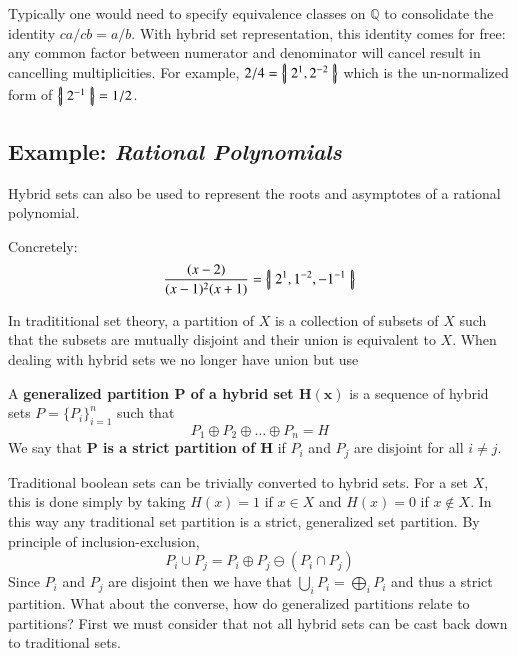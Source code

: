 Typically one would need to specify equivalence classes on $\mathbb{Q}$ to consolidate the identity $ca/cb = a/b$.
With hybrid set representation, this identity comes for free:
any common factor between numerator and denominator will cancel result in cancelling multiplicities. 
For example, $2/4 = \left\{ \! \left| \; 2^1, 2^{-2} \; \right| \! \right\}$ which is the un-normalized form of $\left\{ \! \left| \; 2^{-1} \; \right| \! \right\} = 1/2$.





\subsection{Example: \emph{Rational Polynomials}}

Hybrid sets can also be used to represent the roots and asymptotes of a rational polynomial.


\begin{example} Concretely: 
	\begin{equation}
		\frac{(x-2)}{(x-1)^2(x+1)} = \left\{ \! \left| \;  2^1, 1^{-2}, -1^{-1}  \; \right| \! \right\}
	\end{equation}
\end{example}

\newpage

In tradititional set theory, a partition of $X$ is a collection of subsets of $X$ such that 
the subsets are mutually disjoint and their union is equivalent to $X$.
When dealing with hybrid sets we no longer have union but use 

\begin{definition}
	A \textbf{generalized partition $\boldsymbol{P}$ of a hybrid set $\boldsymbol{H(x)}$} is a sequence of hybrid sets
	$P=\{P_i \}_{i=1}^n$ such that
	\begin{equation}
		P_1 \oplus P_2 \oplus \ldots \oplus P_n = H
	\end{equation}
	We say that \textbf{$\boldsymbol{P}$ is a strict partition of $\boldsymbol{H}$} if 
	$P_i$ and $P_j$ are disjoint for all $i \neq j$.
\end{definition}


Traditional boolean sets can be trivially converted to hybrid sets.
For a set $X$, this is done simply by taking $H(x)=1$ if $x \in X$ and $H(x)=0$ if $x \notin X$.
In this way any traditional set partition is a strict, generalized set partition.
By principle of inclusion-exclusion, 
\begin{equation*}
	P_i \cup P_j = P_i \oplus P_j \ominus (P_i \cap P_j)
\end{equation*}
Since $P_i$ and $P_j$ are disjoint then we have that $\bigcup_i P_i = \bigoplus_i P_i$ and thus a strict partition.
What about the converse, how do generalized partitions relate to partitions?
First we must consider that not all hybrid sets can be cast back down to traditional sets.



